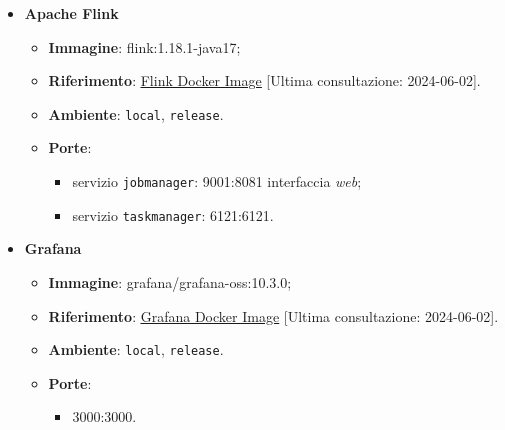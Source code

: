 \begin{itemize}
	\item \textbf{Apache Flink}
	      \begin{itemize}
		      \item \textbf{Immagine}: flink:1.18.1-java17;
		      \item \textbf{Riferimento}: \underline{\href{https://hub.docker.com/_/flink}{Flink Docker Image}} [Ultima consultazione: 2024-06-02].
		      \item \textbf{Ambiente}: \texttt{local}, \texttt{release}.
		      \item \textbf{Porte}:
		            \begin{itemize}
			            \item servizio \texttt{jobmanager}: 9001:8081 interfaccia \textit{web};
			            \item servizio \texttt{taskmanager}: 6121:6121.
		            \end{itemize}
	      \end{itemize}

	\item \textbf{Grafana}
	      \begin{itemize}
		      \item \textbf{Immagine}: grafana/grafana-oss:10.3.0;
		      \item \textbf{Riferimento}: \underline{\href{https://hub.docker.com/r/grafana/grafana-oss}{Grafana Docker Image}} [Ultima consultazione: 2024-06-02].
		      \item \textbf{Ambiente}: \texttt{local}, \texttt{release}.
		      \item \textbf{Porte}:
		            \begin{itemize}
			            \item 3000:3000.
		            \end{itemize}
	      \end{itemize}
\end{itemize}


